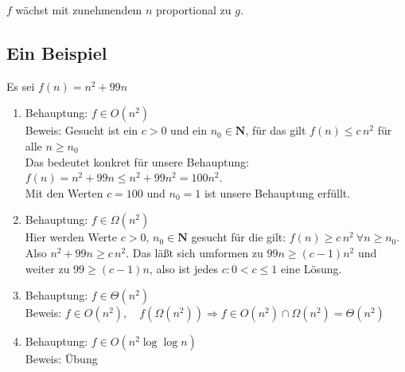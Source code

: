 \documentclass[ngerman]{scrreprt}%
\theoremstyle{break}
\begin{document}
$f$ wächst mit zunehmendem $n$ proportional zu $g$.

%
%

\subsection{Ein Beispiel}
Es sei $f(n) = n^2+99n$

\begin{enumerate}
\item   Behauptung: $f \in O(n^2)$\\
        Beweis: Gesucht ist ein $c>0$ und ein $n_0 \in \mathbf{N}$, für das gilt $f(n)\leq c\,n^2 $ 
        für alle $n\geq n_0$\\
        Das bedeutet konkret für unsere Behauptung:\\
        $f(n)= n^2+99n \leq n^2+99n^2 =100 n^2$.\\
        Mit den Werten $c=100$ und $n_0 = 1$ ist unsere Behauptung erfüllt.

\item   Behauptung: $f \in \Omega(n^2)$\\
        Hier werden Werte $c>0,\,n_0 \in \mathbf{N}$ gesucht für die gilt: $f(n) \geq c\,n^2\ \forall n\geq n_0$. Also $n^2+99n \geq
        c\,n^2$. Das läßt sich umformen zu $99n \geq (c-1)n^2$ und weiter zu $99 \geq (c-1)n$, also ist jedes $c: 0<c \leq 1$ eine
        Lösung.

\item   Behauptung: $f \in \Theta(n^2)$\\
        Beweis: $f \in O(n^2), \quad f(\Omega(n^2)) \Rightarrow f \in O(n^2)\cap \Omega(n^2)=\Theta(n^2)$

\item   Behauptung: $f \in O(n^2 \log\log n)$\\
        Beweis: Übung
\end{enumerate}
\end{document}
